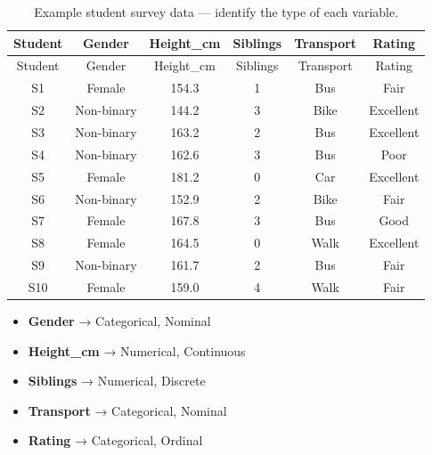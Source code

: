 \documentclass[
  11pt,
  a4paper,
  oneside,
  open=any]{scrbook}
\providecommand{\tightlist}{%
  \setlength{\itemsep}{0pt}\setlength{\parskip}{0pt}}
\begin{document}
\begin{longtable}[]{@{}cccccc@{}}
\caption{Example student survey data --- identify the type of each
variable.}\tabularnewline
\toprule\noalign{}
Student & Gender & Height\_cm & Siblings & Transport & Rating \\
\midrule\noalign{}
\endfirsthead
\toprule\noalign{}
Student & Gender & Height\_cm & Siblings & Transport & Rating \\
\midrule\noalign{}
\endhead
\bottomrule\noalign{}
\endlastfoot
S1 & Female & 154.3 & 1 & Bus & Fair \\
S2 & Non-binary & 144.2 & 3 & Bike & Excellent \\
S3 & Non-binary & 163.2 & 2 & Bus & Excellent \\
S4 & Non-binary & 162.6 & 3 & Bus & Poor \\
S5 & Female & 181.2 & 0 & Car & Excellent \\
S6 & Non-binary & 152.9 & 2 & Bike & Fair \\
S7 & Female & 167.8 & 3 & Bus & Good \\
S8 & Female & 164.5 & 0 & Walk & Excellent \\
S9 & Non-binary & 161.7 & 2 & Bus & Fair \\
S10 & Female & 159.0 & 4 & Walk & Fair \\
\end{longtable}

\begin{tcolorbox}[enhanced jigsaw, breakable, leftrule=.75mm, bottomtitle=1mm, bottomrule=.15mm, titlerule=0mm, left=2mm, opacitybacktitle=0.6, coltitle=black, colbacktitle=quarto-callout-tip-color!10!white, rightrule=.15mm, title=\textcolor{quarto-callout-tip-color}{\faLightbulb}\hspace{0.5em}{Identify the variable types}, toptitle=1mm, arc=.35mm, colback=white, toprule=.15mm, colframe=quarto-callout-tip-color-frame, opacityback=0]

\begin{itemize}
\tightlist
\item
  \textbf{Gender} → Categorical, Nominal
\item
  \textbf{Height\_cm} → Numerical, Continuous
\item
  \textbf{Siblings} → Numerical, Discrete
\item
  \textbf{Transport} → Categorical, Nominal
\item
  \textbf{Rating} → Categorical, Ordinal
\end{itemize}

\end{tcolorbox}
\end{document}
